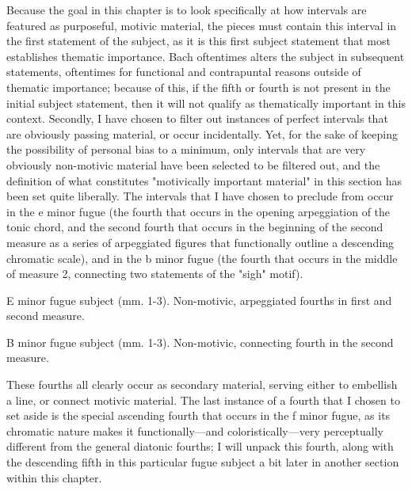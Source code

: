 Because the goal in this chapter is to look specifically at how
intervals are featured as purposeful, motivic material, the pieces must
contain this interval in the first statement of the subject, as it is
this first subject statement that most establishes thematic importance.
Bach oftentimes alters the subject in subsequent statements, oftentimes
for functional and contrapuntal reasons outside of thematic importance;
because of this, if the fifth or fourth is not present in the initial
subject statement, then it will not qualify as thematically important in
this context. Secondly, I have chosen to filter out instances of perfect
intervals that are obviously passing material, or occur incidentally.
Yet, for the sake of keeping the possibility of personal bias to a
minimum, only intervals that are very obviously non-motivic material
have been selected to be filtered out, and the definition of what
constitutes "motivically important material" in this section has been
set quite liberally. The intervals that I have chosen to preclude from
occur in the e minor fugue (the fourth that occurs in the opening
arpeggiation of the tonic chord, and the second fourth that occurs in
the beginning of the second measure as a series of arpeggiated figures
that functionally outline a descending chromatic scale), and in the b
minor fugue (the fourth that occurs in the middle of measure 2,
connecting two statements of the "sigh" motif).



\begin{Example}[H]
\vspace{1.5em}
    \centering
    \caption[E minor fugue subject (mm. 1-3). ]{ E minor fugue subject (mm. 1-3). Non-motivic, arpeggiated fourths in first and second measure.}
\end{Example}    


\begin{Example}[H]
\vspace{1.5em}
    \centering
    \caption[B minor fugue subject (mm. 1-3). ]{ B minor fugue subject (mm. 1-3). Non-motivic, connecting fourth in the second measure.}
\end{Example}    
    These fourths all clearly occur as secondary material, serving either to
embellish a line, or connect motivic material. The last instance of a
fourth that I chosen to set aside is the special ascending fourth that
occurs in the f minor fugue, as its chromatic nature makes it
functionally---and coloristically---very perceptually different
from the general diatonic fourths; I will unpack this fourth, along with
the descending fifth in this particular fugue subject a bit later in
another section within this chapter.



